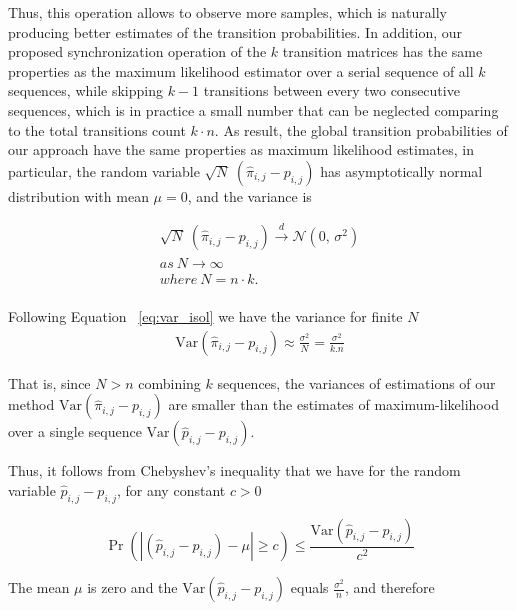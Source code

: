 \par Thus, this operation allows to observe more samples, which is naturally producing better estimates of the transition probabilities. In addition, our proposed synchronization operation of the $k$ transition matrices has the same properties as the maximum likelihood estimator over a serial sequence of all $k$ sequences, while skipping $k-1$ transitions between every two consecutive sequences, which is in practice a small number that can be neglected comparing to the total transitions count $k \cdot n$. As result, the global transition probabilities of our approach  have the same properties as maximum likelihood estimates, in particular, the random variable $\sqrt{N}\ (\hat{\pi}_{i,j} - {p}_{i,j})$ has asymptotically normal distribution with mean $\mu=0$, and the variance is 

\begin{equation}
\begin{aligned}
\label{eq:lim_dist2}
\sqrt{N}\ (\hat{\pi}_{i,j} - {p}_{i,j}) \xrightarrow{d} \mathcal{N}(0,\,\sigma^{2})\\
as\ N \xrightarrow{} \infty\\
where\ N = n \cdot k .\\
\end{aligned}
\end{equation}

 Following Equation ~\ref{eq:var_isol} we have the variance for finite $N$
\begin{equation}
\begin{aligned}
\label{eq:var_sync}
 \mathrm{Var} (\hat{\pi}_{i,j} - {p}_{i,j}) \approx \frac {\sigma^{2}}{N} =  \frac {\sigma^{2}}{k.n}
\end{aligned}
\end{equation}


That is, since $N > n$ combining $k$ sequences, the variances of estimations of our method  $\mathrm{Var} (\hat{\pi}_{i,j} - {p}_{i,j})$ are smaller than the estimates of maximum-likelihood over a single sequence $\mathrm{Var} (\hat{p}_{i,j} - {p}_{i,j})$. 
\par Thus, it follows from Chebyshev's inequality \cite{feller1968introduction} that we have for the random variable $\hat{p}_{i,j} - {p}_{i,j}$, for any constant $c > 0$  

\[ \Pr\left( |(\hat{p}_{i,j} - {p}_{i,j}) - \mu| \geq c \right) \leq
\frac{\mathrm{Var} (\hat{p}_{i,j} - {p}_{i,j})}{c^2} \]


 The mean $\mu$ is zero and the $\mathrm{Var} (\hat{p}_{i,j} - {p}_{i,j})$ equals  $\frac {\sigma^{2}}{n}$, and therefore 
 
